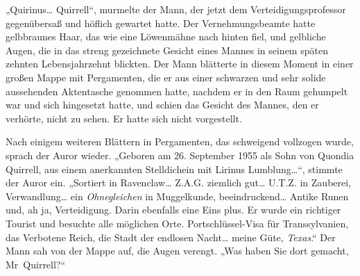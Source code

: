 „Quirinus… Quirrell“, murmelte der Mann, der jetzt dem Verteidigungsprofessor gegenübersaß und höflich gewartet hatte. Der Vernehmungsbeamte hatte gelbbraunes Haar, das wie eine Löwenmähne nach hinten fiel, und gelbliche Augen, die in das streng gezeichnete Gesicht eines Mannes in seinem späten zehnten Lebensjahrzehnt blickten. Der Mann blätterte in diesem Moment in einer großen Mappe mit Pergamenten, die er aus einer schwarzen und sehr solide aussehenden Aktentasche genommen hatte, nachdem er in den Raum gehumpelt war und sich hingesetzt hatte, und schien das Gesicht des Mannes, den er verhörte, nicht zu sehen. Er hatte sich nicht vorgestellt.

Nach einigem weiteren Blättern in Pergamenten, das schweigend vollzogen wurde, sprach der Auror wieder.
„Geboren am 26. September 1955 als Sohn von Quondia Quirrell, aus einem anerkannten Stelldichein mit Lirinus Lumblung…“, stimmte der Auror ein. „Sortiert in Ravenclaw… Z.A.G. ziemlich gut… U.T.Z. in Zauberei, Verwandlung… ein \emph{Ohnegleichen} in Muggelkunde, beeindruckend… Antike Runen und, ah ja, Verteidigung. Darin ebenfalls eine Eins plus. Er wurde ein richtiger Tourist und besuchte alle möglichen Orte. Portschlüssel-Visa für Transsylvanien, das Verbotene Reich, die Stadt der endlosen Nacht… meine Güte, \emph{Texas}.“
Der Mann sah von der Mappe auf, die Augen verengt.
„Was haben Sie dort gemacht, Mr~Quirrell?“

